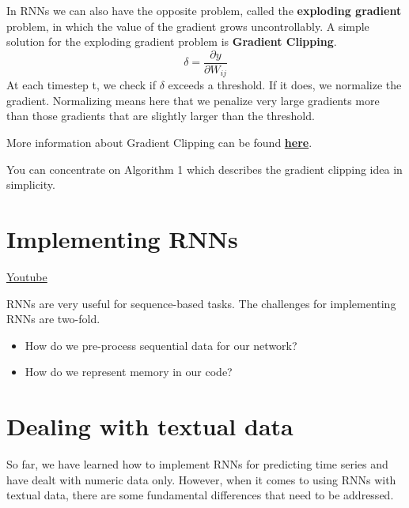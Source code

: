 In RNNs we can also have the opposite problem, called the \textbf{exploding gradient} problem, in which the value of the gradient grows uncontrollably. A simple solution for the exploding gradient problem is \textbf{Gradient Clipping}. \[\delta = \frac{\partial y}{\partial W_{ij}}\]
At each timestep t, we check if \(\delta\) exceeds a threshold. If it does, we normalize the gradient. Normalizing means here that we penalize very large gradients more than those gradients that are slightly larger than the threshold. \newline

More information about Gradient Clipping can be found \href{https://arxiv.org/abs/1211.5063}{\textbf{here}}. \newline

You can concentrate on Algorithm 1 which describes the gradient clipping idea in simplicity.

\section{Implementing RNNs}
\href{https://www.youtube.com/watch?v=BHoiwB61ays&ab_channel=Udacity}{Youtube} \newline

RNNs are very useful for sequence-based tasks. The challenges for implementing RNNs are two-fold.

\begin{itemize}
    \item How do we pre-process sequential data for our network?
    \item How do we represent memory in our code?
\end{itemize}



\section{Dealing with textual data}

So far, we have learned how to implement RNNs for predicting time series and have dealt with numeric data only. However, when it comes to using RNNs with textual data, there are some fundamental differences that need to be addressed.

